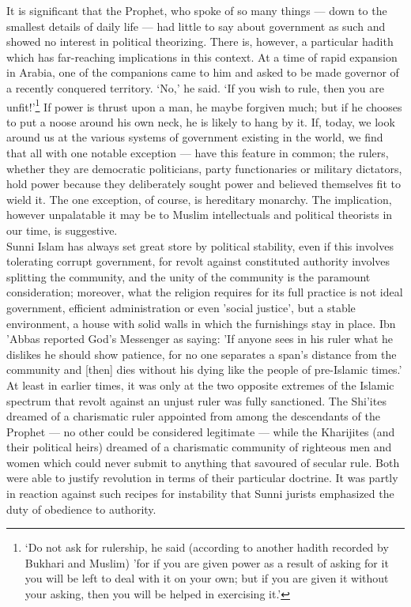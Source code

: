 \documentclass[10pt, twoside,openright]{book}
\begin{document}
It is significant that the Prophet, who spoke of so many things --- down to the smallest details of 
daily life --- had little to say about government as such and showed no interest in political 
theorizing. There is, however, a particular hadith which has far\hyp{}reaching implications in this 
context. At a time of rapid expansion in Arabia, one of the companions came to him and asked to be 
made governor of a recently conquered territory. `No,' he said. `If you wish to rule, then you are 
unfit!'\footnote{`Do not ask for rulership, he said (according to another hadith recorded by Bukhari and Muslim) 'for if you are given power as a result of asking for it you will be left to deal with it on your 
own; but if you are given it without your asking, then you will be helped in exercising it.'} If power is thrust upon a man, he maybe forgiven much; but if he chooses to put a noose 
around his own neck, he is likely to hang by it. If, today, we look around us at the various systems 
of government existing in the world, we find that all with one notable exception --- have this feature 
in common; the rulers, whether they are democratic politicians, party functionaries or military 
dictators, hold power because they deliberately sought power and believed themselves fit to wield it. 
The one exception, of course, is hereditary monarchy. The implication, however unpalatable it may be 
to Muslim intellectuals and political theorists in our time, is suggestive. \\

Sunni Islam has always set great store by political stability, even if this involves tolerating 
corrupt government, for revolt against constituted authority involves splitting the community, and 
the unity of the community is the paramount consideration; moreover, what the religion requires for 
its full practice is not ideal government, efficient administration or even 'social justice', but a 
stable environment, a house with solid walls in which the furnishings stay in place. Ibn 'Abbas 
reported God's Messenger as saying: 'If anyone sees in his ruler what he dislikes he should show 
patience, for no one separates a span's distance from the community and [then] dies without his dying 
like the people of pre\hyp{}Islamic times.' \\

At least in earlier times, it was only at the two opposite extremes of the Islamic spectrum that 
revolt against an unjust ruler was fully sanctioned. The Shi'ites dreamed of a charismatic ruler 
appointed from among the descendants of the Prophet --- no other could be considered legitimate --- while 
the Kharijites (and their political heirs) dreamed of a charismatic community of righteous men and 
women which could never submit to anything that savoured of secular rule. Both were able to justify 
revolution in terms of their particular doctrine. It was partly in reaction against such recipes for 
instability that Sunni jurists emphasized the duty of obedience to authority. \\
\end{document}
